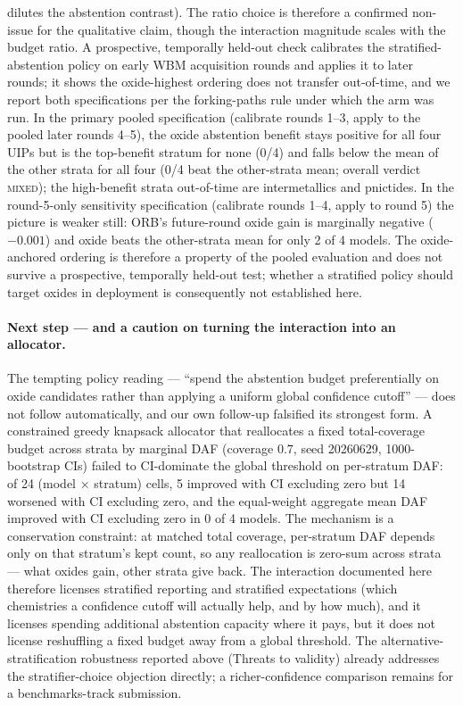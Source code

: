 \documentclass[11pt]{article}
\begin{document}
dilutes the abstention contrast). The ratio choice is therefore a confirmed non-issue for
the qualitative claim, though the interaction magnitude scales with the budget ratio.
A prospective, temporally held-out check calibrates the stratified-abstention policy on early
WBM acquisition rounds and applies it to later rounds; it shows the oxide-highest
ordering does not transfer out-of-time, and we report both specifications
per the forking-paths rule under which the arm was run. In the primary pooled specification
(calibrate rounds 1--3, apply to the pooled later rounds 4--5), the oxide abstention benefit
stays positive for all four UIPs but is the top-benefit stratum for none (0/4)
and falls below the mean of the other strata for all four (0/4 beat the
other-strata mean; overall verdict \textsc{mixed}); the high-benefit strata out-of-time are
intermetallics and pnictides. In the round-5-only sensitivity specification (calibrate rounds
1--4, apply to round 5) the picture is weaker still: ORB's future-round oxide gain is
marginally negative ($-0.001$) and oxide beats the other-strata mean for only 2 of 4
models. The oxide-anchored ordering is therefore a property of the pooled evaluation
and does not survive a prospective, temporally held-out test; whether a stratified policy
should target oxides in deployment is consequently not established here.

\paragraph{Next step --- and a caution on turning the interaction into an allocator.} The
tempting policy reading --- ``spend the abstention budget preferentially on oxide candidates
rather than applying a uniform global confidence cutoff'' --- does not follow
automatically, and our own follow-up falsified its strongest form. A constrained greedy
knapsack allocator that reallocates a fixed total-coverage budget across strata by marginal
DAF (coverage $0.7$, seed 20260629, 1000-bootstrap CIs) failed to CI-dominate the global
threshold on per-stratum DAF:
of 24 (model $\times$ stratum) cells, 5 improved with CI excluding zero but 14 worsened
with CI excluding zero, and the equal-weight aggregate mean DAF improved with CI excluding
zero in 0 of 4 models. The mechanism is a conservation constraint: at matched total coverage,
per-stratum DAF depends only on that stratum's kept count, so any reallocation is zero-sum
across strata --- what oxides gain, other strata give back. The interaction documented here
therefore licenses stratified reporting and stratified expectations (which chemistries
a confidence cutoff will actually help, and by how much), and it licenses spending
additional abstention capacity where it pays, but it does not license reshuffling a
fixed budget away from a global threshold. The alternative-stratification robustness reported
above (Threats to validity) already addresses the stratifier-choice objection directly; a
richer-confidence comparison remains for a benchmarks-track submission.
\end{document}
